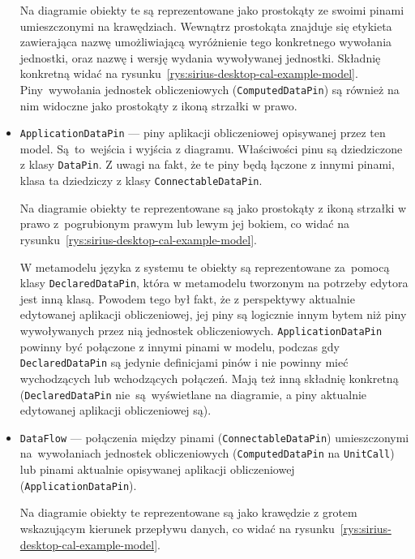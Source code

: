 \begin{itemize}
	      Na diagramie obiekty te są reprezentowane jako prostokąty ze
	      swoimi pinami umieszczonymi na krawędziach. Wewnątrz prostokąta
	      znajduje się
	      etykieta zawierająca nazwę umożliwiającą wyróżnienie tego
	      konkretnego wywołania
	      jednostki, oraz nazwę i wersję wydania wywoływanej jednostki.
	      Składnię
	      konkretną widać na
	      rysunku~\ref{rys:sirius-desktop-cal-example-model}.
	      Piny~wywołania jednostek obliczeniowych
	      (\texttt{ComputedDataPin}) są również
	      na nim widoczne jako prostokąty z ikoną strzałki w prawo.

	\item \texttt{ApplicationDataPin} --- piny aplikacji obliczeniowej
	      opisywanej przez ten model. Są~to~wejścia i wyjścia z diagramu.
	      Właściwości pinu są dziedziczone z klasy \texttt{DataPin}. Z
	      uwagi na fakt, że
	      te piny będą łączone z innymi pinami, klasa ta dziedziczy z klasy
	      \texttt{ConnectableDataPin}.

	      Na diagramie obiekty te reprezentowane są jako prostokąty z ikoną
	      strzałki w prawo z~pogrubionym prawym lub lewym jej bokiem, co
	      widać na
	      rysunku~\ref{rys:sirius-desktop-cal-example-model}.

	      W metamodelu języka \CAL{} z systemu \BalticLSC{} te obiekty są
	      reprezentowane za~pomocą klasy \texttt{DeclaredDataPin}, która w
	      metamodelu
	      tworzonym na potrzeby edytora jest inną klasą. Powodem tego był
	      fakt, że z
	      perspektywy aktualnie edytowanej aplikacji obliczeniowej, jej
	      piny są logicznie
	      innym bytem niż piny wywoływanych przez nią jednostek
	      obliczeniowych.
	      \texttt{ApplicationDataPin} powinny być połączone z innymi
	      pinami w modelu, podczas gdy \texttt{DeclaredDataPin} są jedynie
	      definicjami pinów i nie powinny mieć wychodzących lub wchodzących
	      połączeń.
	      Mają też
	      inną składnię konkretną (\texttt{DeclaredDataPin}
	      nie~są~wyświetlane na
	      diagramie, a piny aktualnie edytowanej aplikacji obliczeniowej
	      są).

	\item \texttt{DataFlow} --- połączenia między pinami
	      (\texttt{ConnectableDataPin}) umieszczonymi na~wywołaniach
	      jednostek obliczeniowych (\texttt{ComputedDataPin} na
	      \texttt{UnitCall}) lub pinami aktualnie opisywanej aplikacji
	      obliczeniowej
	      (\texttt{ApplicationDataPin}).

	      Na diagramie obiekty te reprezentowane są jako krawędzie z grotem
	      wskazującym kierunek przepływu danych, co widać na
	      rysunku~\ref{rys:sirius-desktop-cal-example-model}.
\end{itemize}

